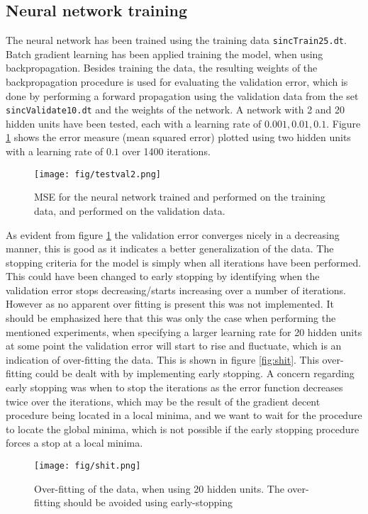\documentclass{article}
\begin{document}
\subsection{Neural network training}
The neural network has been trained using the training data \texttt{sincTrain25.dt}. Batch gradient learning has been applied training the model, when using backpropagation. Besides training the data, the resulting weights of the backpropagation procedure is used for evaluating the validation error, which is done by performing a forward propagation using the validation data from the set \texttt{sincValidate10.dt} and the weights of the network. A network with 2 and 20 hidden units have been tested, each with a learning rate of $0.001,0.01,0.1$.
Figure \ref{fig:twoplots} shows the error measure (mean squared error) plotted using two hidden units with a learning rate of $0.1$ over 1400 iterations.
\begin{figure}[H]
  \centering
  \texttt{[image: fig/testval2.png]}
  \caption{MSE for the neural network trained and performed on the training data, and performed on the validation data.}
  \label{fig:twoplots}
\end{figure}
As evident from figure \ref{fig:twoplots} the validation error converges nicely in a decreasing manner, this is good as it indicates a better generalization of the data. The stopping criteria for the model is simply when all iterations have been performed. This could have been changed to early stopping by identifying when the validation error stops decreasing/starts increasing over a number of iterations. However as no apparent over fitting is present this was not implemented. It should be emphasized here that this was only the case when performing the mentioned experiments, when specifying a larger learning rate for 20 hidden units at some point the validation error will start to rise and fluctuate, which is an indication of over-fitting the data. This is shown in figure \ref{fig:shit}. This over-fitting could be dealt with by implementing early stopping. A concern regarding early stopping was when to stop the iterations as the error function decreases twice over the iterations, which may be the result of the gradient decent procedure being located in a local minima, and we want to wait for the procedure to locate the global minima, which is not possible if the early stopping procedure forces a stop at a local minima.
\begin{figure}[H]
  \centering
  \texttt{[image: fig/shit.png]}
  \caption{Over-fitting of the data, when using 20 hidden units. The over-fitting should be avoided using early-stopping}
  \label{fig:mulplots}
\end{figure}
\end{document}
